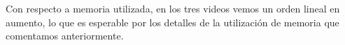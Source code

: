 \begin{figure}[ht]
	\begin{center}
	\end{center}
\end{figure}
\FloatBarrier
\par Con respecto a memoria utilizada, en los tres videos vemos un orden lineal en aumento, lo que es esperable por los detalles de la utilizaci\'on de memoria que comentamos anteriormente.

